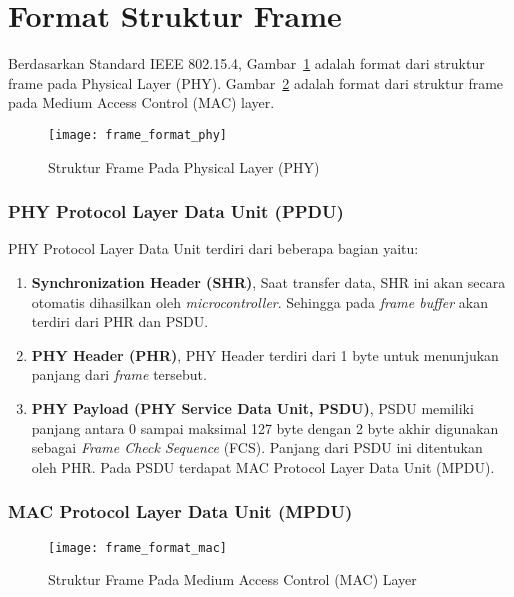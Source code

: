 \section{Format Struktur Frame} %
Berdasarkan Standard IEEE 802.15.4, Gambar~\ref{fig:frame_format_phy} adalah format dari struktur frame pada Physical Layer (PHY). Gambar~\ref{fig:frame_format_mac} adalah format dari struktur frame pada Medium Access Control (MAC) layer.

\begin{figure} [htbp]
	\centering  
	\texttt{[image: frame\_format\_phy]}  
	\caption[Struktur Frame Pada Physical Layer (PHY)]{Struktur Frame Pada Physical Layer (PHY)} 
	\label{fig:frame_format_phy} 
\end{figure} 

\subsubsection{PHY Protocol Layer Data Unit (PPDU)} 
PHY Protocol Layer Data Unit terdiri dari beberapa bagian yaitu:
\begin{enumerate}
    \item \textbf{Synchronization Header (SHR)}, Saat transfer data, SHR ini akan secara otomatis dihasilkan oleh \textit{microcontroller}. Sehingga pada \textit{frame buffer} akan terdiri dari PHR dan PSDU.
    \item \textbf{PHY Header (PHR)}, PHY Header terdiri dari 1 byte untuk menunjukan panjang dari \textit{frame} tersebut.
    \item \textbf{PHY Payload (PHY Service Data Unit, PSDU)}, PSDU memiliki panjang antara 0 sampai maksimal 127 byte dengan 2 byte akhir digunakan sebagai \textit{Frame Check Sequence} (FCS). Panjang dari PSDU ini ditentukan oleh PHR. Pada PSDU terdapat MAC Protocol Layer Data Unit (MPDU).
\end{enumerate}

\subsubsection{MAC Protocol Layer Data Unit (MPDU)} 
\begin{figure} [H]
	\centering  
	\texttt{[image: frame\_format\_mac]}  
	\caption[Struktur Frame Pada Medium Access Control (MAC) Layer]{Struktur Frame Pada Medium Access Control (MAC) Layer} 
	\label{fig:frame_format_mac} 
\end{figure} 

